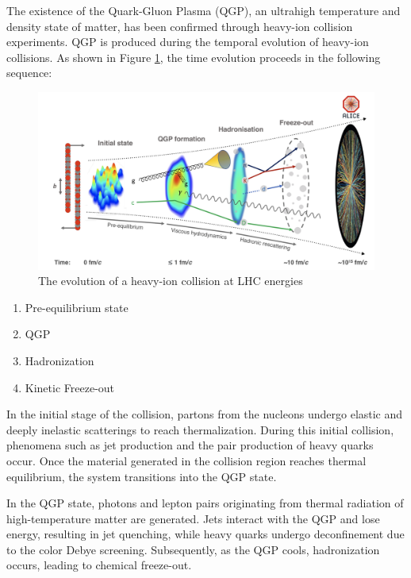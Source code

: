         The existence of the Quark-Gluon Plasma (QGP), an ultrahigh temperature and density state of matter, has been confirmed through heavy-ion collision experiments. QGP is produced during the temporal evolution of heavy-ion collisions. As shown in Figure \ref{Intro:HIC:space_time_evaluation_of_HIC}, the time evolution proceeds in the following sequence:  
        
        \begin{figure}[hbtp]
            \centering
            \includegraphics[keepaspectratio, scale=0.4]{fig/1_5_QGP_Evol.png}
            \caption{The evolution of a heavy-ion collision at LHC energies\cite{QGP_evo}}
            \label{Intro:HIC:space_time_evaluation_of_HIC}
        \end{figure}
        
        \begin{enumerate}
            \item Pre-equilibrium state
            \item QGP
            \item Hadronization
            \item Kinetic Freeze-out
        \end{enumerate}
        
        In the initial stage of the collision, partons from the nucleons undergo elastic and deeply inelastic scatterings to reach thermalization. During this initial collision, phenomena such as jet production and the pair production of heavy quarks occur. Once the material generated in the collision region reaches thermal equilibrium, the system transitions into the QGP state.  
        
        In the QGP state, photons and lepton pairs originating from thermal radiation of high-temperature matter are generated. Jets interact with the QGP and lose energy, resulting in jet quenching, while heavy quarks undergo deconfinement due to the color Debye screening. Subsequently, as the QGP cools, hadronization occurs, leading to chemical freeze-out.  
        
